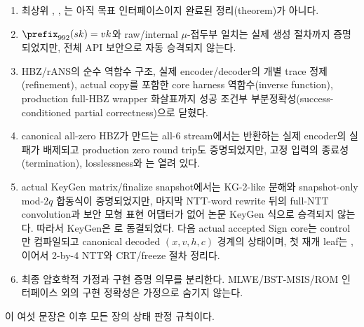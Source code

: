 \begin{enumerate}
  \item 최상위 , ,
        는 아직 목표 인터페이스이지 완료된 정리(theorem)가 아니다.
  \item \(\prefix_{992}(sk)=vk\)와 raw/internal \(\mu\)-접두부 일치는 실제
        생성 절차까지 증명되었지만, 전체 API 보안으로 자동 승격되지 않는다.
  \item HBZ/rANS의 순수 역함수 구조, 실제 encoder/decoder의 개별 trace
        정제(refinement), actual copy를 포함한 core harness 역함수(inverse
        function), production full-HBZ wrapper 화살표까지 성공 조건부
        부분정확성(success-conditioned partial correctness)으로 닫혔다.
  \item canonical all-zero HBZ가 만드는 all-6 stream에서는 반환하는 실제
        encoder의 실패가 배제되고 production zero round trip도 증명되었지만,
        고정 입력의 종료성(termination), losslessness와 는
        열려 있다.
  \item actual KeyGen matrix/finalize snapshot에서는 KG-2-like 분해와
        snapshot-only mod-\(2q\) 합동식이 증명되었지만,
        마지막  NTT-word rewrite 뒤의 full-NTT convolution과
        보안 모형 표현 어댑터가 없어 논문 KeyGen 식으로 승격되지 않는다.
        따라서 KeyGen은 로 동결되었다. 다음 actual
        accepted Sign core는 control만 컴파일되고 canonical decoded \((x,v,h,c)\)
        경계의  상태이며, 첫 재개 leaf는
        , 이어서 2-by-4 NTT와
        CRT/freeze 절차 정리다.
  \item 최종 암호학적 가정과 구현 증명 의무를 분리한다. MLWE/BST-MSIS/ROM
        인터페이스 외의 구현 정확성은 가정으로 숨기지 않는다.
\end{enumerate}

이 여섯 문장은 이후 모든 장의 상태 판정 규칙이다.
